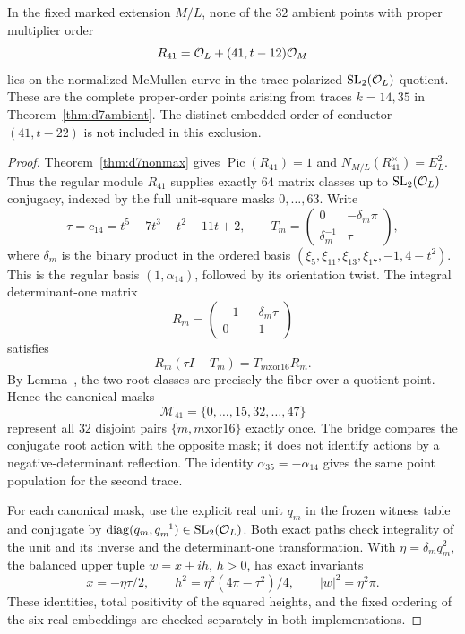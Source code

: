 \begin{theorem}
\label{thm:d7r41complete}
In the fixed marked extension $M/L$, none of the $32$ ambient points
with proper multiplier order
\[
 R_{41}=\mathcal O_L+(41,t-12)\mathcal O_M
\]
lies on the normalized McMullen curve in the trace-polarized
$\operatorname{SL}_2(\mathcal O_L)$ quotient.  These are the complete proper-order points
arising from traces $k=14,35$ in Theorem~\ref{thm:d7ambient}.
The distinct embedded order of conductor $(41,t-22)$ is not included
in this exclusion.
\end{theorem}
\begin{proof}
Theorem~\ref{thm:d7nonmax} gives $\operatorname{Pic}(R_{41})=1$
and $N_{M/L}(R_{41}^{\times})=E_L^2$.  Thus the regular module
$R_{41}$ supplies exactly $64$ matrix classes up to $\operatorname{SL}_2(\mathcal O_L)$ conjugacy,
indexed by the full unit-square masks $0,\ldots,63$.
Write
\[
 \tau=c_{14}=t^5-7t^3-t^2+11t+2,\qquad
 T_m=\begin{pmatrix}0&-\delta_m\pi\\\delta_m^{-1}&\tau\end{pmatrix},
\]
where $\delta_m$ is the binary product in the ordered basis
$(\xi_5,\xi_{11},\xi_{13},\xi_{17},-1,4-t^2)$.
This is the regular basis $(1,\alpha_{14})$, followed by its
orientation twist.  The integral determinant-one matrix
\[
 R_m=\begin{pmatrix}-1&-\delta_m\tau\\0&-1\end{pmatrix}
\]
satisfies
\[
 R_m(\tau I-T_m)=T_{m\mathbin{\mathrm{xor}}16}R_m.
\]
By Lemma~, the two root classes are
precisely the fiber over a quotient point.  Hence the canonical masks
\[
 \mathcal M_{41}=\{0,\ldots,15,32,\ldots,47\}
\]
represent all $32$ disjoint pairs $\{m,m\mathbin{\mathrm{xor}}16\}$
exactly once.  The bridge compares the conjugate root action with the
opposite mask; it does not identify actions by a negative-determinant
reflection.  The identity $\alpha_{35}=-\alpha_{14}$ gives the same
point population for the second trace.

For each canonical mask, use the explicit real unit $q_m$ in the
frozen witness table and conjugate by
$\operatorname{diag}(q_m,q_m^{-1})\in\operatorname{SL}_2(\mathcal O_L)$.
Both exact paths check integrality of the unit and its inverse and
the determinant-one transformation.  With $\eta=\delta_mq_m^2$,
the balanced upper tuple $w=x+ih$, $h>0$, has exact invariants
\[
 x=-\eta\tau/2,\qquad
 h^2=\eta^2(4\pi-\tau^2)/4,\qquad |w|^2=\eta^2\pi.
\]
These identities, total positivity of the squared heights, and the
fixed ordering of the six real embeddings are checked separately
in both implementations.


\end{proof}
